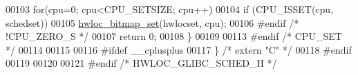 \begin{DoxyCode}
00103   \textcolor{keywordflow}{for}(cpu=0; cpu<CPU\_SETSIZE; cpu++)
00104     \textcolor{keywordflow}{if} (CPU\_ISSET(cpu, schedset))
00105       \hyperlink{a00065_ga497556af0cc34f109ae0277999c074d3}{hwloc_bitmap_set}(hwlocset, cpu);
00106 \textcolor{preprocessor}{#endif }\textcolor{comment}{/* !CPU\_ZERO\_S */}
00107   \textcolor{keywordflow}{return} 0;
00108 \}
00109 
00113 \textcolor{preprocessor}{#endif }\textcolor{comment}{/* CPU\_SET */}
00114 
00115 
00116 \textcolor{preprocessor}{#ifdef \_\_cplusplus}
00117 \textcolor{preprocessor}{}\} \textcolor{comment}{/* extern "C" */}
00118 \textcolor{preprocessor}{#endif}
00119 \textcolor{preprocessor}{}
00120 
00121 \textcolor{preprocessor}{#endif }\textcolor{comment}{/* HWLOC\_GLIBC\_SCHED\_H */}
\end{DoxyCode}
